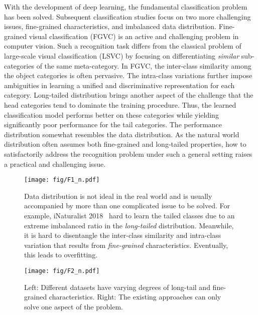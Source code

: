\documentclass{article}
\begin{document}
With the development of deep learning, the fundamental classification problem has been solved. Subsequent classification studies focus on two more challenging issues, fine-grained characteristics, and imbalanced data distribution. Fine-grained visual classification (FGVC) is an active and challenging problem in computer vision. Such a recognition task differs from the classical problem of large-scale visual classification (LSVC) by focusing on differentiating {\em similar} sub-categories of the same meta-category. In FGVC, the inter-class similarity among the object categories is often pervasive. The intra-class variations further impose ambiguities in learning a unified and discriminative representation for each category. Long-tailed distribution brings another aspect of the challenge that the head categories tend to dominate the training procedure. Thus, the learned classification model performs better on these categories while yielding significantly poor performance for the tail categories. The performance distribution somewhat resembles the data distribution. As the natural world distribution often assumes both fine-grained and long-tailed properties, how to satisfactorily address the recognition problem under such a general setting raises a practical and challenging issue.

\begin{figure}[t!]
    \centering
    \texttt{[image: fig/F1\_n.pdf]}
    \caption{Data distribution is not ideal in the real world and is usually accompanied by more than one complicated issue to be solved. For example, iNaturalist 2018~\cite{van2018inaturalist} hard to learn the tailed classes due to an extreme imbalanced ratio in the \textit{long-tailed} distribution. Meanwhile, it is hard to disentangle the inter-class similarity and intra-class variation that results from \textit{fine-grained} characteristics.  Eventually, this leads to overfitting.}
    \label{fig:intro}
    \vspace{-5pt}
\end{figure}


\begin{figure*}[ht!]
    \centering
    \texttt{[image: fig/F2\_n.pdf]}
    \caption{Left: Different datasets have varying degrees of long-tail and fine-grained characteristics. Right: The existing approaches can only solve one aspect of the problem.}
    \label{fig:confusionLoss}
    \vspace{-10pt}
\end{figure*}
\end{document}
